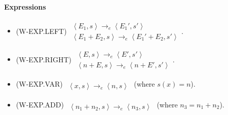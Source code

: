 \documentclass[twocolumn,english]{article}
\begin{document}
\paragraph{Expressions}
\begin{itemize}
\item {\scriptsize{}{}{}(W-EXP.LEFT)} $\begin{array}{c}
\left\langle E_{1},s\right\rangle \rightarrow_{e}\left\langle E_{1}',s'\right\rangle \\
\hline \left\langle E_{1}+E_{2},s\right\rangle \rightarrow_{e}\left\langle E_{1}'+E_{2},s'\right\rangle 
\end{array}$. 
\item {\scriptsize{}{}{}(W-EXP.RIGHT)} $\begin{array}{c}
\left\langle E,s\right\rangle \rightarrow_{e}\left\langle E',s'\right\rangle \\
\hline \left\langle n+E,s\right\rangle \rightarrow_{e}\left\langle n+E',s'\right\rangle 
\end{array}$. 
\item {\scriptsize{}{}{}(W-EXP.VAR)} $\begin{array}{c}
\\
\hline \left\langle x,s\right\rangle \rightarrow_{e}\left\langle n,s\right\rangle 
\end{array}$ (where $s(x)=n$). 
\item {\scriptsize{}{}{}(W-EXP.ADD)} $\begin{array}{c}
\\
\hline \left\langle n_{1}+n_{2},s\right\rangle \rightarrow_{e}\left\langle n_{3},s\right\rangle 
\end{array}$ (where $n_{3}=n_{1}+n_{2}$). 
\end{itemize}
\end{document}

